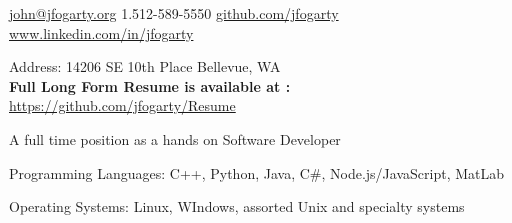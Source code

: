 \documentclass[10pt,letterpaper]{article}
\begin{document}
\sloppy  %



\nobreakvspace{1em}  %

\noindent\href{mailto:john.at.jfogarty.dot.org}{john\mbox{}@\mbox{}jfogarty.org}\sbull
\textsmaller{+}1.512-589-5550\sbull
\href{https://github.com/jfogarty}{github.com/jfogarty}
\sbull
\href{http://www.linkedin.com/in/jfogarty}{www.linkedin.com/in/jfogarty}

\nobreakvspace{1mm}  %
\noindent
Address: 14206 SE 10th Place\sbull
Bellevue, WA
\\
\textbf{Full Long Form Resume is available at :}
\href{https://github.com/jfogarty/Resume/raw/master/jfogarty-resume-2018.pdf}{https://github.com/jfogarty/Resume}

\spacedhrule{0.9em}{-0.4em}  %



\inlineheadsection
{A full time position as a hands on Software Developer}
{}

\vspace{1em}\spacedhrule{0.5em}{-0.4em}


\vspace{0.5em}
\inlineheadsection
{Programming Languages:}
{C++, Python, Java, C\#, Node.js/JavaScript, MatLab}

\vspace{0.5em}\inlineheadsection
{Operating Systems:}
{Linux, WIndows, assorted Unix and specialty systems}
\end{document}
